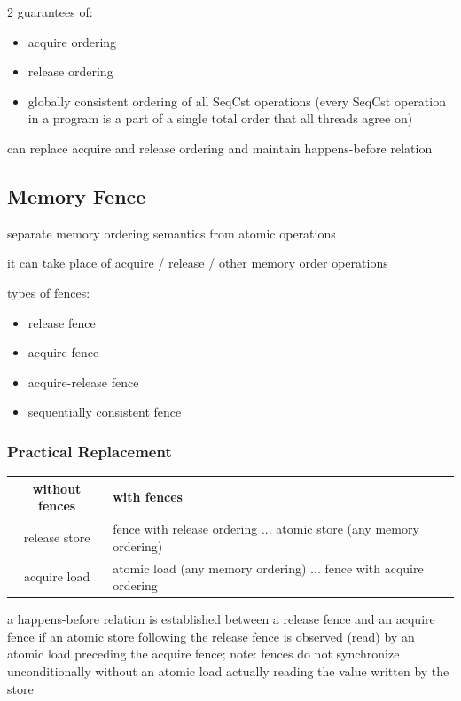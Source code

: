 \documentclass[8pt]{extarticle}
\begin{document}
\begin{multicols*}{2}
    guarantees of:
    \begin{itemize}
    \item acquire ordering
    \item release ordering
    \item globally consistent ordering of all SeqCst operations (every SeqCst operation in a program is a part of a single total order that all threads agree on)
    \end{itemize}

    can replace acquire and release ordering and maintain happens-before relation
    
    \subsection{Memory Fence}

    separate memory ordering semantics from atomic operations

    it can take place of acquire / release / other memory order operations

    types of fences:
    \begin{itemize}
    \item release fence
    \item acquire fence
    \item acquire-release fence
    \item sequentially consistent fence
    \end{itemize}
      
    \subsubsection{Practical Replacement}
    
    \begin{tabular}{| c | p{50mm} |}
    \hline
    \textbf{without fences} & \textbf{with fences} \\
    \hline
    release store & fence with release ordering \newline ... \newline atomic store (any memory ordering) \\
    \hline
    acquire load & atomic load (any memory ordering) \newline ... \newline fence with acquire ordering \\
    \hline
    \end{tabular}

    a happens-before relation is established between a release fence and an acquire fence if an atomic store following the release fence is observed (read) by an atomic load preceding the acquire fence; note: fences do not synchronize unconditionally without an atomic load actually reading the value written by the store


\end{multicols*}
\end{document}
